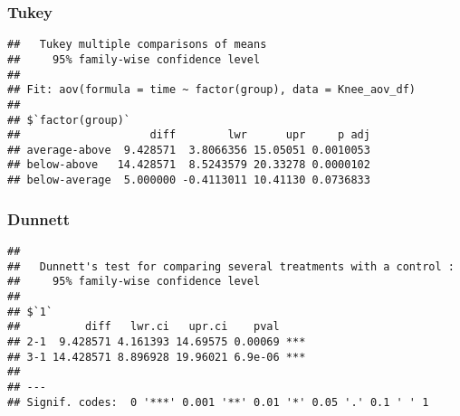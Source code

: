 \documentclass[]{article}
\newenvironment{Shaded}{\begin{snugshade}}{\end{snugshade}}
\newcommand{\KeywordTok}[1]{\textcolor[rgb]{0.13,0.29,0.53}{\textbf{#1}}}
\newcommand{\DataTypeTok}[1]{\textcolor[rgb]{0.13,0.29,0.53}{#1}}
\newcommand{\StringTok}[1]{\textcolor[rgb]{0.31,0.60,0.02}{#1}}
\newcommand{\OperatorTok}[1]{\textcolor[rgb]{0.81,0.36,0.00}{\textbf{#1}}}
\newcommand{\NormalTok}[1]{#1}
\begin{document}
\subsubsection{Tukey}\label{tukey}

\begin{Shaded}
\end{Shaded}

\begin{verbatim}
##   Tukey multiple comparisons of means
##     95% family-wise confidence level
## 
## Fit: aov(formula = time ~ factor(group), data = Knee_aov_df)
## 
## $`factor(group)`
##                    diff        lwr      upr     p adj
## average-above  9.428571  3.8066356 15.05051 0.0010053
## below-above   14.428571  8.5243579 20.33278 0.0000102
## below-average  5.000000 -0.4113011 10.41130 0.0736833
\end{verbatim}

\subsubsection{Dunnett}\label{dunnett}

\begin{Shaded}
\end{Shaded}

\begin{verbatim}
## 
##   Dunnett's test for comparing several treatments with a control :  
##     95% family-wise confidence level
## 
## $`1`
##          diff   lwr.ci   upr.ci    pval    
## 2-1  9.428571 4.161393 14.69575 0.00069 ***
## 3-1 14.428571 8.896928 19.96021 6.9e-06 ***
## 
## ---
## Signif. codes:  0 '***' 0.001 '**' 0.01 '*' 0.05 '.' 0.1 ' ' 1
\end{verbatim}
\end{document}
